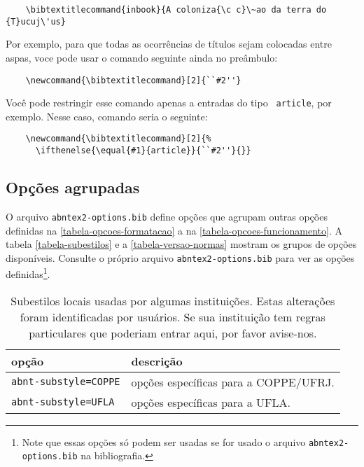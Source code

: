 \documentclass[a4paper]{ltxdoc}
\begin{document}
\begin{verbatim}
    \bibtextitlecommand{inbook}{A coloniza{\c c}\~ao da terra do {T}ucuj\'us}
\end{verbatim}

Por exemplo, para que todas as ocorrências de títulos sejam colocadas entre
aspas, voce pode usar o comando seguinte ainda no preâmbulo:

\begin{verbatim}
    \newcommand{\bibtextitlecommand}[2]{``#2''}
\end{verbatim}

Você pode restringir esse comando apenas a entradas do tipo {\tt
article}, por exemplo. Nesse caso, comando seria o seguinte:

\begin{verbatim}
    \newcommand{\bibtextitlecommand}[2]{%
      \ifthenelse{\equal{#1}{article}}{``#2''}{}}
\end{verbatim}


\subsection{Opções agrupadas}

O arquivo {\tt abntex2-options.bib} define opções que agrupam outras opções
definidas na \autoref{tabela-opcoes-formatacao} a na
\autoref{tabela-opcoes-funcionamento}. A tabela \autoref{tabela-subestilos} e a
\autoref{tabela-versao-normas} mostram os grupos de opções disponíveis. Consulte
o próprio arquivo {\tt abntex2-options.bib} para ver as opções 
definidas\footnote{Note que essas opções só podem ser usadas se for usado o
arquivo {\tt abntex2-options.bib} na bibliografia.}.

\begin{table}[htbp]

\caption[Subestilos de diversas instituições]{
Subestilos locais usadas por algumas instituições. Estas alterações
foram identificadas por usuários. Se sua instituição
tem regras particulares que poderiam entrar aqui, por favor avise-nos.}
\label{tabela-subestilos}

\begin{center}
\begin{tabular}{lp{8cm}}\hline\hline
opção  & descrição \\ \hline
{\tt abnt-substyle=COPPE} & opções específicas para a COPPE/UFRJ.\\
{\tt abnt-substyle=UFLA} & opções específicas para a UFLA.\\
\hline\hline
\end{tabular}
\end{center}
\end{table}
\end{document}
